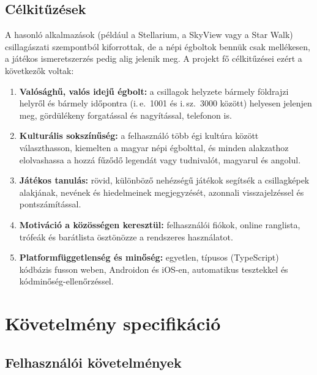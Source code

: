 \documentclass[12pt,a4paper]{article}
\begin{document}
\subsection{Célkitűzések}

A hasonló alkalmazások (például a Stellarium, a SkyView vagy a Star Walk) csillagászati
szempontból kiforrottak, de a népi égboltok bennük csak mellékesen, a játékos ismeretszerzés
pedig alig jelenik meg. A projekt fő célkitűzései ezért a következők
voltak:

\begin{enumerate}[label=\Roman*.,leftmargin=1.2cm]
  \item \textbf{Valósághű, valós idejű égbolt:} a csillagok helyzete bármely földrajzi helyről
        és bármely időpontra (i.\,e.\ 1001 és i.\,sz.\ 3000 között) helyesen jelenjen meg,
        gördülékeny forgatással és nagyítással, telefonon is.
  \item \textbf{Kulturális sokszínűség:} a felhasználó több égi kultúra között választhasson,
        kiemelten a magyar népi égbolttal, és minden alakzathoz elolvashassa a hozzá fűződő
        legendát vagy tudnivalót, magyarul és angolul.
  \item \textbf{Játékos tanulás:} rövid, különböző nehézségű játékok segítsék a csillagképek
        alakjának, nevének és hiedelmeinek megjegyzését, azonnali visszajelzéssel és
        pontszámítással.
  \item \textbf{Motiváció a közösségen keresztül:} felhasználói fiókok, online ranglista,
        trófeák és barátlista ösztönözze a rendszeres használatot.
  \item \textbf{Platformfüggetlenség és minőség:} egyetlen, típusos (TypeScript) kódbázis
        fusson weben, Androidon és iOS-en, automatikus tesztekkel és kódminőség-ellenőrzéssel.
\end{enumerate}

\section{Követelmény specifikáció}

\subsection{Felhasználói követelmények}
\end{document}
